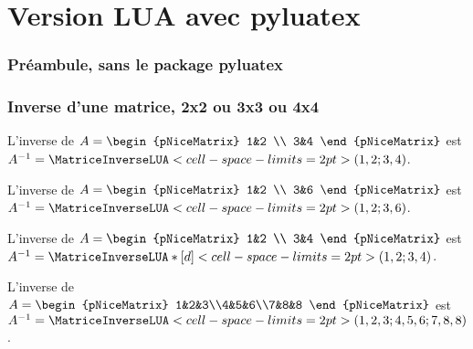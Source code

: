 \documentclass[french,a4paper,10pt]{article}
\begin{document}
\part*{Version \og LUA \fg{} avec pyluatex}

\section{Préambule, sans le package pyluatex}


\section{Inverse d'une matrice, 2x2 ou 3x3 ou 4x4}

\begin{demohigh}
L'inverse de $A=\begin{pNiceMatrix} 1&2 \\ 3&4 \end{pNiceMatrix}$ est
$A^{-1}=\MatriceInverseLUA<cell-space-limits=2pt>(1,2;3,4)$.
\end{demohigh}

\begin{demohigh}
L'inverse de $A=\begin{pNiceMatrix} 1&2 \\ 3&6 \end{pNiceMatrix}$ est
$A^{-1}=\MatriceInverseLUA<cell-space-limits=2pt>(1,2;3,6)$.
\end{demohigh}

\begin{demohigh}
L'inverse de $A=\begin{pNiceMatrix} 1&2 \\ 3&4 \end{pNiceMatrix}$ est
$A^{-1}=\MatriceInverseLUA*[d]<cell-space-limits=2pt>(1,2;3,4)$.
\end{demohigh}

\begin{demohigh}
L'inverse de $A=\begin{pNiceMatrix} 1&2&3\\4&5&6\\7&8&8 \end{pNiceMatrix}$ est
$A^{-1}=\MatriceInverseLUA<cell-space-limits=2pt>(1,2,3;4,5,6;7,8,8)$.
\end{demohigh}
\end{document}
